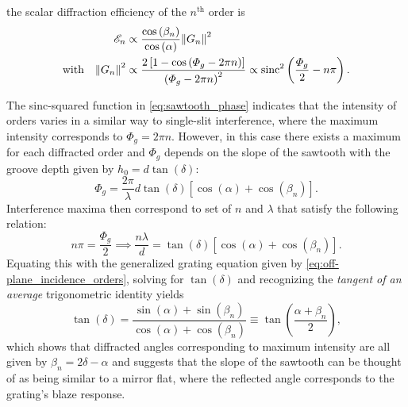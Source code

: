 the scalar diffraction efficiency of the $n^{\text{th}}$ order is 
\begin{align}\label{eq:sawtooth_phase}
\begin{split}
 \mathscr{E}_n &\propto \frac{\cos \left( \beta_n \right)}{\cos \left( \alpha \right)} \norm{G_n}^2 \\
 \text{with} \quad \norm{G_n}^2  &\propto \frac{2 \left[ 1 - \cos \left( \Phi_g - 2 \pi n  \right) \right]}{\left( \Phi_g - 2 \pi n \right)^2} \propto \operatorname{sinc}^2 \left( \frac{\Phi_g}{2} - n \pi \right) . 
 \end{split}
 \end{align}

The sinc-squared function in \cref{eq:sawtooth_phase} indicates that the intensity of orders varies in a similar way to single-slit interference, where the maximum intensity corresponds to $\Phi_g = 2 \pi n$. 
However, in this case there exists a maximum for each diffracted order and $\Phi_g$ depends on the slope of the sawtooth with the groove depth given by $h_0 = d \tan \left( \delta \right)$:
\begin{equation}\label{eq:sawtooth_path}
 \Phi_g = \frac{2 \pi}{\lambda} d \tan \left( \delta \right) \left[ \cos (\alpha) + \cos (\beta_n) \right] .
 \end{equation}
Interference maxima then correspond to set of $n$ and $\lambda$ that satisfy the following relation:
\begin{equation}\label{eq:blaze_condition}
 n \pi = \frac{\Phi_g}{2} \implies \frac{n \lambda}{d} = \tan \left( \delta \right) \left[ \cos (\alpha) + \cos (\beta_n) \right] .
\end{equation}
Equating this with the generalized grating equation given by \cref{eq:off-plane_incidence_orders}, solving for $\tan \left( \delta \right)$ and recognizing the \emph{tangent of an average} trigonometric identity yields 
\begin{equation}
 \tan \left( \delta \right) = \frac{\sin (\alpha) + \sin (\beta_n)}{\cos (\alpha) + \cos (\beta_n)} \equiv \tan \left( \frac{\alpha + \beta_n}{2} \right),
 \end{equation}
which shows that diffracted angles corresponding to maximum intensity are all given by $\beta_n = 2 \delta - \alpha$ and suggests that the slope of the sawtooth can be thought of as being similar to a mirror flat, where the reflected angle corresponds to the grating's blaze response. 
